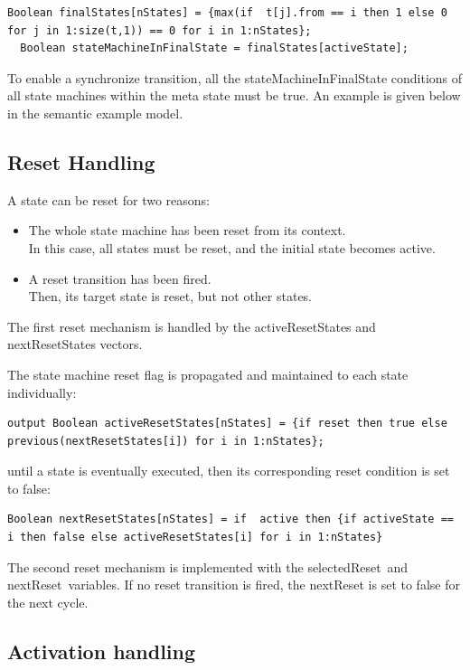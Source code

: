 \documentclass[10pt,a4paper]{report}
\def\doublelabel#1{\label{#1}}
\begin{document}
\begin{lstlisting}[language=modelica]
  Boolean finalStates[nStates] = {max(if  t[j].from == i then 1 else 0 for j in 1:size(t,1)) == 0 for i in 1:nStates};
  Boolean stateMachineInFinalState = finalStates[activeState];
\end{lstlisting}
To enable a synchronize transition, all the stateMachineInFinalState
conditions of all state machines within the meta state must be true. An
example is given below in the semantic example model.

\subsection{Reset Handling}\doublelabel{reset-handling}

A state can be reset for two reasons:

\begin{itemize}
\item
  The whole state machine has been reset from its context.\\
  In this case, all states must be reset, and the initial state becomes
  active.
\item
  A reset transition has been fired.\\
  Then, its target state is reset, but not other states.
\end{itemize}

The first reset mechanism is handled by the activeResetStates and
nextResetStates vectors.

The state machine reset flag is propagated and maintained to each state
individually:

\begin{lstlisting}[language=modelica]
  output Boolean activeResetStates[nStates] = {if reset then true else previous(nextResetStates[i]) for i in 1:nStates};
\end{lstlisting}
until a state is eventually executed, then its corresponding reset
condition is set to false:

\begin{lstlisting}[language=modelica]
  Boolean nextResetStates[nStates] = if  active then {if activeState == i then false else activeResetStates[i] for i in 1:nStates}
\end{lstlisting}
The second reset mechanism is implemented with the selectedReset~and
nextReset~variables. If no reset transition is fired, the nextReset is
set to false for the next cycle.

\subsection{Activation handling}\doublelabel{activation-handling}
\end{document}
